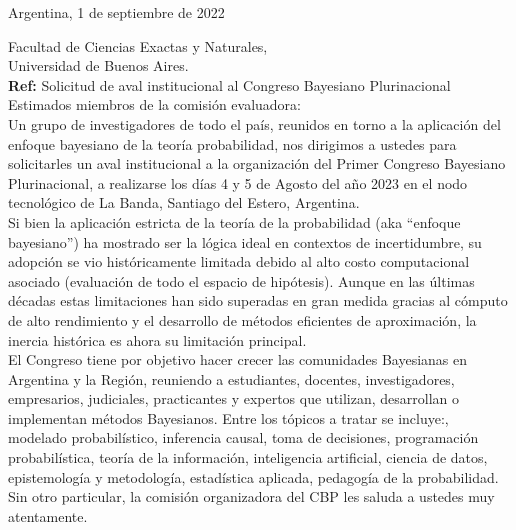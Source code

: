 \documentclass[a4paper,11pt]{article}
\begin{document}
\begin{flushright}
Argentina, 1 de septiembre de 2022
\end{flushright} 

\vspace{0.1cm}
\noindent
Facultad de Ciencias Exactas y Naturales,\\
Universidad de Buenos Aires.\\[-0.1cm]

\hfill \textbf{Ref:} Solicitud de aval institucional al Congreso Bayesiano Plurinacional \\

\vspace{0.3cm} \noindent Estimados miembros de la comisión evaluadora:\\

\indent Un grupo de investigadores de todo el país, reunidos en torno a la aplicación del enfoque bayesiano de la teoría probabilidad, nos dirigimos a ustedes para solicitarles un aval institucional a la organización del Primer Congreso Bayesiano Plurinacional, a realizarse los días 4 y 5 de Agosto del año 2023 en el nodo tecnológico de La Banda, Santiago del Estero, Argentina. \\

\indent Si bien la aplicación estricta de la teoría de la probabilidad (aka ``enfoque bayesiano'') ha mostrado ser la lógica ideal en contextos de incertidumbre, su adopción se vio históricamente limitada debido al alto costo computacional asociado (evaluación de todo el espacio de hipótesis). Aunque en las últimas décadas estas limitaciones han sido superadas en gran medida gracias al cómputo de alto rendimiento y el desarrollo de métodos eficientes de aproximación, la inercia histórica es ahora su limitación principal. \\

\indent  El Congreso tiene por objetivo hacer crecer las comunidades Bayesianas en Argentina y la Región, reuniendo a estudiantes, docentes, investigadores, empresarios, judiciales, practicantes y expertos que utilizan, desarrollan o implementan métodos Bayesianos. Entre los tópicos a tratar se incluye:, modelado probabilístico, inferencia causal, toma de decisiones, programación probabilística, teoría de la información, inteligencia artificial, ciencia de datos, epistemología y metodología, estadística aplicada, pedagogía de la probabilidad. \\

\indent Sin otro particular, la comisión organizadora del CBP les saluda a ustedes muy atentamente.\\
\end{document}
